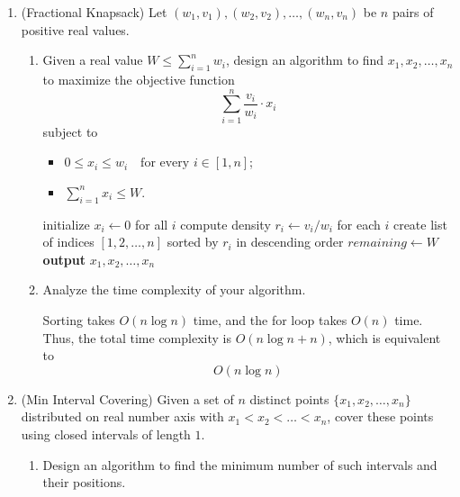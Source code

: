 \documentclass[12pt,a4paper]{article}
\theoremstyle{definition}
\begin{document}
\begin{enumerate}
  \item {\color{purple}(Fractional Knapsack)} Let \((w_{1},v_{1}), (w_{2},v_{2}), \ldots, (w_{n},v_{n})\) be \(n\) pairs of positive real values. 
\begin{enumerate}
    \item Given a real value \(W \leq \sum_{i=1}^{n} w_{i}\), design an algorithm to find \(x_{1}, x_{2}, \ldots, x_{n}\) to maximize the objective function
\[
\sum_{i=1}^{n} \frac{v_{i}}{w_{i}} \cdot x_{i}
\]
subject to
\begin{itemize}
    \item $0 \leq x_{i} \leq w_{i} \quad \text{for every } i \in [1,n]$;
    \item $\sum_{i=1}^{n} x_{i} \leq W$.
\end{itemize}

    \begin{algorithm}[H]
        \LinesNumbered
        \BlankLine
        \caption{Fractional Knapsack} \label{Algorithm 1}
        
        initialize $x_i \leftarrow 0$ for all $i$\;
        compute density $r_i \leftarrow v_i / w_i$ for each $i$\;
        create list of indices $[1,2,\ldots,n]$ sorted by $r_i$ in descending order\;
        $remaining \leftarrow W$\;
        \textbf{output} $x_1, x_2, \ldots, x_n$\;
    \end{algorithm}

    \item Analyze the time complexity of your algorithm.

    Sorting takes $O(n\log n)$ time, and the for loop takes $O(n)$ time. Thus, the total time complexity is $O(n \log n + n)$, which is equivalent to 
            \[
            \boxed{O(n\log n)}
            \]
\end{enumerate}





  \item {\color{purple} (Min Interval Covering)} Given a set of $n$ distinct points $\{x_1, x_2, \dots, x_n\}$ distributed on real number axis with $x_1 < x_2 < \dots < x_n$, cover these points using closed intervals of length $1$.  
\begin{enumerate}
    \item Design an algorithm to find the minimum number of such intervals and their positions.
        \begin{algorithm}[H]
            \LinesNumbered
            \BlankLine
            \caption{Min Interval Covering} \label{Algorithm 2}
            

\end{algorithm}
\end{enumerate}
\end{enumerate}
\end{document}
